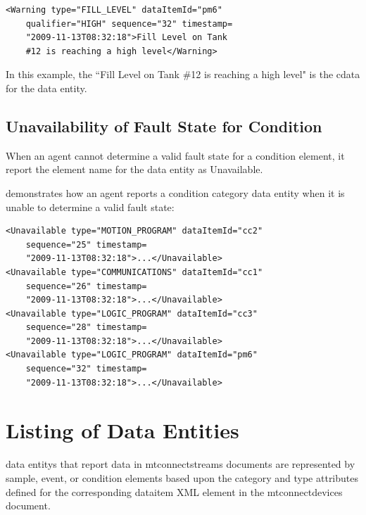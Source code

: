 \begin{lstlisting}[firstnumber=1,escapechar=|,%
    caption={Example of CDATA for Condition},label={lst:example-of-cdata-for-condition}]
<Warning type="FILL_LEVEL" dataItemId="pm6" 
    qualifier="HIGH" sequence="32" timestamp=
    "2009-11-13T08:32:18">Fill Level on Tank
    #12 is reaching a high level</Warning>
\end{lstlisting}

In this example, the “Fill Level on Tank \#12 is reaching a high level" is the \gls{cdata} for the \gls{data entity}.

\subsection{Unavailability of Fault State for Condition}\label{sec:Unavailability of Fault State for Condition}

When an \gls{agent} cannot determine a valid \gls{fault state} for a \gls{condition} element, it \must report the \gls{element name} for the \gls{data entity} as Unavailable.

 demonstrates how an \gls{agent} reports a \gls{condition} category \gls{data entity} when it is unable to determine a valid \gls{fault state}:

\begin{lstlisting}[firstnumber=1,escapechar=|,%
    caption={Example of Condition when Fault State is UNAVAILABLE},label={lst:example-of-condition-when-fault-state-is-unavailable}]
<Unavailable type="MOTION_PROGRAM" dataItemId="cc2" 
    sequence="25" timestamp=
    "2009-11-13T08:32:18">...</Unavailable>
<Unavailable type="COMMUNICATIONS" dataItemId="cc1" 
    sequence="26" timestamp=
    "2009-11-13T08:32:18">...</Unavailable>
<Unavailable type="LOGIC_PROGRAM" dataItemId="cc3"
    sequence="28" timestamp=
    "2009-11-13T08:32:18">...</Unavailable>
<Unavailable type="LOGIC_PROGRAM" dataItemId="pm6"
    sequence="32" timestamp=
    "2009-11-13T08:32:18">...</Unavailable>
\end{lstlisting}

\section{Listing of Data Entities}\label{sec:Listing of Data Entities}

\glspl{data entity} that report data in \gls{mtconnectstreams} documents are represented by \gls{sample}, \gls{event}, or \gls{condition} elements based upon the \gls{category} and \gls{type} attributes defined for the corresponding \gls{dataitem} XML element in the \gls{mtconnectdevices} document.

